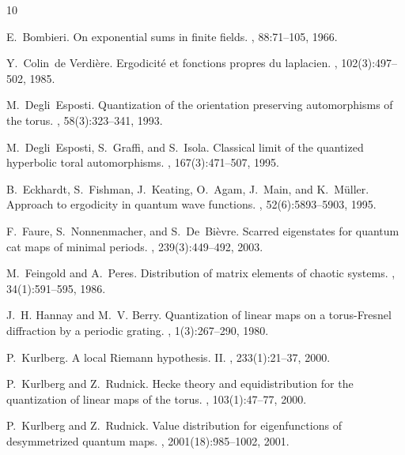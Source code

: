 \documentclass[12pt]{amsart}
\theoremstyle{plain}
\renewcommand{\^}{\widehat}
\begin{document}
\begin{thebibliography}{10}

E.~Bombieri.
\newblock On exponential sums in finite fields.
, 88:71--105, 1966.

Y.~Colin~de Verdi{\`e}re.
\newblock Ergodicit\'e et fonctions propres du laplacien.
, 102(3):497--502, 1985.

M.~Degli~Esposti.
\newblock Quantization of the orientation preserving automorphisms of the
  torus.
, 58(3):323--341, 1993.

M.~Degli~Esposti, S.~Graffi, and S.~Isola.
\newblock Classical limit of the quantized hyperbolic toral automorphisms.
, 167(3):471--507, 1995.

B.~Eckhardt, S.~Fishman, J.~Keating, O.~Agam, J.~Main, and K.~M\"uller.
\newblock Approach to ergodicity in quantum wave functions.
, 52(6):5893--5903, 1995.


F.~Faure, S.~Nonnenmacher, and S.~De~Bi{\`e}vre.
\newblock Scarred eigenstates for quantum cat maps of minimal periods.
, 239(3):449--492, 2003.


M.~Feingold and A.~Peres.
\newblock Distribution of matrix elements of chaotic systems.
, 34(1):591--595, 1986.

J.~H. Hannay and M.~V. Berry.
\newblock Quantization of linear maps on a torus-{F}resnel diffraction by a
  periodic grating.
, 1(3):267--290, 1980.


P.~Kurlberg.
\newblock A local {R}iemann hypothesis. {I}{I}.
, 233(1):21--37, 2000.

P.~Kurlberg and Z.~Rudnick.
\newblock Hecke theory and equidistribution for the quantization of linear maps
  of the torus.
, 103(1):47--77, 2000.

P.~Kurlberg and Z.~Rudnick.
\newblock Value distribution for eigenfunctions of desymmetrized quantum maps.
, 2001(18):985--1002, 2001.


\end{thebibliography}
\end{document}
